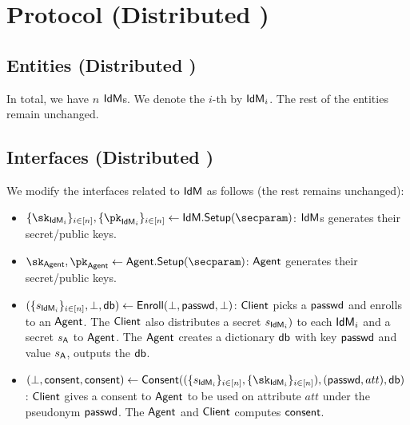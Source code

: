 \section{Protocol (Distributed \idm)}
\subsection{Entities  (Distributed \idm)}
In total, we have $n$ $\textsf{IdM}$s. We denote the $i$-th by $\textsf{IdM}_i$. The rest of the entities remain unchanged.
\subsection{Interfaces (Distributed \idm)}
We modify the interfaces related to $\textsf{IdM}$ as follows (the rest remains unchanged):

\begin{itemize}
    \item  $\idmskdist, \idmpkdist \gets \idm.\mathsf{Setup(\secparam)}$: $\textsf{IdM}$s generates their secret/public keys.
    \item $\sk_\signserv, \pk_\signserv \gets \signserv.\mathsf{Setup}(\secparam)$:  $\textsf{Agent}$ generates their secret/public keys.

    \item $(\{s_{\textsf{IdM}_i}\}_{i \in [n]}, \bot, \mathsf{db}) \gets \mathsf{Enroll}(\bot, \textsf{passwd}, \bot)$: $\textsf{Client}$ picks a $\textsf{passwd}$ and enrolls to an $\textsf{Agent}$. The $\textsf{Client}$ also distributes a secret $s_{\textsf{IdM}_i})$ to each $\textsf{IdM}_i$ and a secret $s_\mathsf{A}$ to $\textsf{Agent}$. The $\textsf{Agent}$ creates a dictionary $\mathsf{db}$ with key $\textsf{passwd}$ and value $s_\mathsf{A}$, outputs the $\mathsf{db}$.

    \item $(\bot, \consent, \consent) \gets \mathsf{Consent}((\idmsdist, \idmskdist), (\pseudo, att), \dict)$: $\textsf{Client}$ gives a consent to $\textsf{Agent}$ to be used on attribute $att$ under the pseudonym $\textsf{passwd}$. The $\textsf{Agent}$ and $\textsf{Client}$ computes $\mathsf{consent}$.
\end{itemize}

